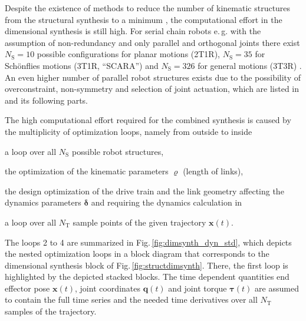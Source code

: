 \documentclass{svproc}
\newcommand{\bm}[1]{\boldsymbol{#1}}
\begin{document}

Despite the existence of methods to reduce the number of kinematic structures from the structural synthesis to a minimum \cite{RamirezKotOrt2015}, the computational effort in the dimensional synthesis is still high.
For serial chain robots e.\,g. with the assumption of non-redundancy and only parallel and orthogonal joints there exist $N_\mathrm{S}{=}10$ possible configurations for planar motions (2T1R), $N_\mathrm{S}{=}35$ for Schönflies motions (3T1R, ``SCARA'') and $N_\mathrm{S}{=}326$ for general motions (3T3R) \cite{RamirezKotOrt2015,RamirezKotOrt2017}.
An even higher number of parallel robot structures exists due to the possibility of overconstraint, non-symmetry and selection of joint actuation, which are listed in \cite{Gogu2008} and its following parts.

The high computational effort required for the combined synthesis is caused by the multiplicity of optimization loops, namely from outside to inside
\begin{compactenum}
\item a loop over all $N_{\mathrm{S}}$ possible robot structures,
\item the optimization of the kinematic parameters $\bm{\varrho}$ (length of links),
\item the design optimization of the drive train and the link geometry affecting the dynamics parameters $\bm{\delta}$ and requiring the dynamics calculation in 
\item a loop over all $N_\mathrm{T}$ sample points of the given trajectory $\bm{x}(t)$.
\end{compactenum}

The loops 2 to 4 are summarized in Fig.\,\ref{fig:dimsynth_dyn_std}, which depicts the nested optimization loops in a block diagram that corresponds to the dimensional synthesis block of Fig.\,\ref{fig:structdimsynth}.
There, the first loop is highlighted by the depicted stacked blocks.
The time dependent quantities end effector pose $\bm{x}(t)$, joint coordinates $\bm{q}(t)$ and joint torque $\bm{\tau}(t)$ are assumed to contain the full time series and the needed time derivatives over all $N_\mathrm{T}$ samples of the trajectory.
\end{document}
